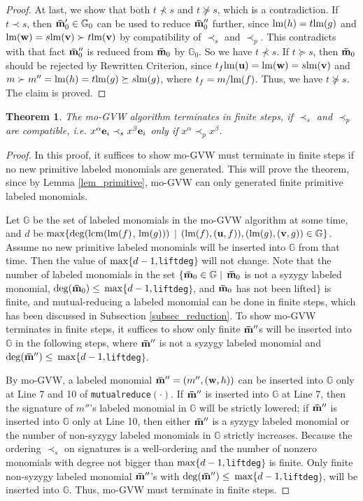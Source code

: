 \documentclass[final, number, 3p,12pt]{elsarticle}
\newtheorem{theorem}{Theorem}[section]
\def\G{{\mathbb{G}}}
\def\brm{{\bf \bar{m}}}
\def\lm{{\rm lm}} %
\def\e{{\bf e}}
\def\u{{\bf u}}
\def\v{{\bf v}}
\def\w{{\bf w}}
\def\lcm{{\rm lcm}}
\def\deg{{\rm deg}}
\def\max{{\rm max}}
\begin{document}
\begin{proof}
At last, we show that both $t \not\prec s$ and $t \not \succeq s$, which is a contradiction. If $t \prec s$, then $\brm'_0 \in \G_0$ can be used to reduce $\brm''_0$ further, since $\lm(h) = t\lm(g)$ and $\lm(\w) = s\lm(\v) \succ t\lm(\v)$ by compatibility of $\prec_s$ and $\prec_p$. This contradicts with that fact $\brm''_0$ is reduced from $\brm_0$ by $\G_0$. So we have $t \not\prec s$. If $t \succeq s$, then $\brm_0$ should be rejected by Rewritten Criterion, since  $t_f\lm(\u) = \lm(\w) = s\lm(\v)$ and $m \succ m'' =  \lm(h) = t\lm(g) \succeq s\lm(g)$, where $t_f = m/\lm(f)$. Thus, we have $t \not\succeq s$. The claim is proved.
\end{proof}




\begin{theorem} \label{thm_termination}
The mo-GVW algorithm terminates in finite steps, if $\prec_s$ and $\prec_p$ are compatible, i.e. $x^\alpha\e_i \prec_s x^\beta\e_i$ only if $x^\alpha \prec_p x^\beta$.
\end{theorem}

\begin{proof}
In this proof, it suffices to show mo-GVW must terminate in finite steps if no new primitive labeled monomials are generated. This will prove the theorem, since by Lemma \ref{lem_primitive}, mo-GVW can only generated finite primitive labeled monomials.

Let $\G$ be the set of labeled monomials in the mo-GVW algorithm at some time, and $d$ be $\max\{\deg(\lcm(\lm(f)$, $\lm(g)))$ $\mid$ $(\lm(f), (\u, f)), (\lm(g), (\v, g)) \in \G\}$.  Assume no new primitive labeled monomials will be inserted into $\G$ from that time. Then the value of $\max\{d - 1, ${\tt liftdeg}$\}$ will not change. Note that the number of labeled monomials in the set $\{\brm_0\in \G \mid$ $\brm_0$ is not a syzygy labeled monomial, $\deg(\brm_0) \le$ $\max\{d - 1, ${\tt liftdeg}$\}$, and $\brm_0$ has not been lifted$\}$ is finite, and mutual-reducing a labeled monomial can be done in finite steps, which has been discussed in Subsection \ref{subsec_reduction}. To show mo-GVW terminates in finite steps, it suffices to show only finite $\brm''$s will be inserted into $\G$ in the following steps, where $\brm''$ is not a syzygy labeled monomial and $\deg(\brm'') \le$ $\max\{d - 1, ${\tt liftdeg}$\}$.

By mo-GVW, a labeled monomial $\brm'' = (m'', (\w, h))$ can be inserted into $\G$ only at Line 7 and 10 of {\tt mutualreduce}$(\cdot)$. If $\brm''$ is inserted into $\G$ at Line 7, then the signature of $m''$'s labeled monomial in $\G$ will be strictly lowered; if $\brm''$ is inserted into $\G$ only at Line 10, then either $\brm''$ is a syzygy labeled monomial or the number of non-syzygy labeled monomials in $\G$ strictly increases. Because the ordering $\prec_s$ on signatures is a well-ordering and the number of nonzero monomials with degree not bigger than $\max\{d - 1, ${\tt liftdeg}$\}$ is finite. Only finite non-syzygy labeled monomial $\brm''$'s with $\deg(\brm'') \le$ $\max\{d - 1, ${\tt liftdeg}$\}$, will be inserted into $\G$. Thus, mo-GVW must terminate in finite steps.
\end{proof}
\end{document}
